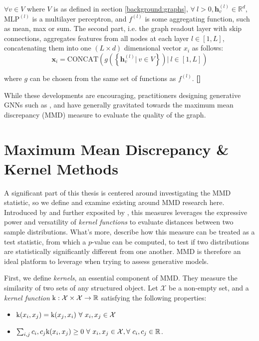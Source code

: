 $\forall v\in V$ where $V$ is as defined in section \ref{background:graphs},
$\forall\ l>0, \mathbf{h}_{v}^{(l)}\in\mathbb{R}^d$, $\text{MLP}^{(l)}$ is a
multilayer perceptron, and $f^{(l)}$ is some aggregating function, such as mean,
max or sum. The second part, i.e. the graph readout layer with skip connections,
aggregates features from all nodes at each layer $l\in [1,L]$, concatenating
them into one $(L\times d)$ dimensional vector $x_i$ as follows:
\begin{equation}
  \label{eq:readout_gin}
  \mathbf{x}_i = \text{CONCAT}\left(  g\left( \left\{ \mathbf{h}_{v}^{(l)} |\ v\in V \right\} \right) |\ l \in [1, L] \right)
\end{equation}

where $g$ can be chosen from the same set of functions as $f^{(l)}$. \textbf{[]}

While these developments are encouraging, practitioners designing generative
GNNs such as \cite{liao2019efficient, niu2020permutation}, and
\cite{you2018graphrnn} have generally gravitated towards the maximum mean
discrepancy (MMD) measure to evaluate the quality of the graph.

\section{Maximum Mean Discrepancy \& Kernel Methods}\label{background:kernels}

A significant part of this thesis is centered around investigating the MMD
statistic, so we define and examine existing around MMD research here. Introduced by
\cite{borgwardt2006integrating} and further exposited by
\cite{gretton2012kernel}, this measures leverages the expressive power and
versatility of \emph{kernel functions} to evaluate distances between two sample
distributions. What's more, \cite{gretton2012kernel} describe how this measure
can be treated as a test statistic, from which a $p$-value can be computed, to
test if two distributions are statistically significantly different from one
another. MMD is therefore an ideal platform to leverage when trying to assess
generative models.

First, we define \emph{kernels}, an essential component of MMD. They measure the
similarity of two sets of any structured object. Let $\mathcal{X}$ be a
non-empty set, and a \emph{kernel function}
$\text{k}:\mathcal{X}\times \mathcal{X}\to\mathbb{R} $ satisfying the following
properties:

\begin{itemize}
\item $\tk(x_i,x_j)=\tk(x_j,x_i)\ \forall\ x_i,x_j\in\mathcal{X}$
\item $\sum_{i,j}c_i,c_j\tk(x_i,x_j)\geq 0\ \forall\ x_i,x_j\in\mathcal{X},
  \forall\ c_i,c_j\in\R$.
\end{itemize}


